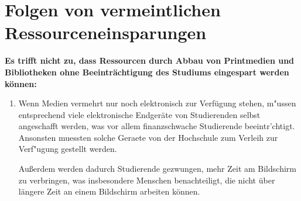 \documentclass[DIV=calc]{scrartcl}
\begin{document}
\section{Folgen von vermeintlichen Ressourceneinsparungen}

\textbf{Es trifft nicht zu, dass Ressourcen durch Abbau von Printmedien und Bibliotheken ohne Beeinträchtigung des Studiums eingespart werden können:}

\begin{enumerate}
\item Wenn Medien vermehrt nur noch elektronisch zur Verfügung stehen, m"ussen entsprechend viele elektronische Endgeräte von Studierenden selbst angeschafft werden, was vor allem finanzschwache Studierende beeintr'chtigt.
Ansonsten muessten solche Geraete von der Hochschule zum Verleih zur Verf"ugung gestellt werden.

Außerdem werden dadurch Studierende gezwungen, mehr Zeit am Bildschirm zu verbringen, was insbesondere Menschen benachteiligt, die nicht über längere Zeit an einem Bildschirm arbeiten können.



\end{enumerate}
\end{document}
